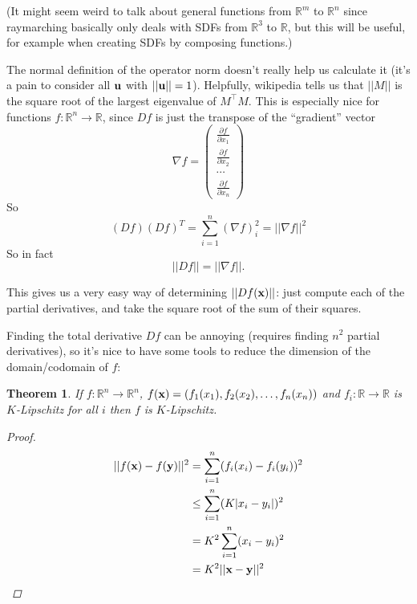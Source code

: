 \documentclass{article}
\newcommand\bb\mathbb
\renewcommand\vec\textbf
\newtheorem{theorem}{Theorem}
\newcommand\pp[2]{\frac{\partial #1}{\partial #2}}
\newcommand\transpose{^\top}
\begin{document}
(It might seem weird to talk about general functions from $\bb R^m$ to $\bb R^n$ since
raymarching basically only deals with SDFs from $\bb R^3$ to $\bb R$, but this will be useful,
for example when creating SDFs by composing functions.)

The normal definition of the operator norm doesn't really help us calculate it (it's a pain
to consider all $\vec u$ with $||\vec u|| = 1$). Helpfully, wikipedia tells us that
$||M||$ is the square root of the largest eigenvalue of $M\transpose M$.
This is especially nice for functions $f:\bb R^n\to \bb R$, since $Df$ is just the transpose of the ``gradient''
vector
$$\nabla f = \begin{pmatrix}
\pp f{x_1}\\ \pp f{x_2}\\\cdots\\\pp f{x_n}
\end{pmatrix}$$
So
$$(Df)(Df)^T = \sum_{i=1}^n (\nabla f)_i^2 = ||\nabla f||^2$$
So in fact
$$||Df|| = ||\nabla f||.$$

This gives us a very easy way of determining $||Df(\vec x)||$: just compute each of the
partial derivatives, and take the square root of the sum of their squares.

Finding the total derivative $Df$ can be annoying (requires finding $n^2$ partial derivatives),
so it's nice to have some tools to reduce the dimension of the domain/codomain of $f$:
\begin{theorem}
\label{component-wise}
If $f:\bb R^n\to\bb R^n$, $f(\vec x) = (f_1(x_1) , f_2(x_2), \dots, f_n(x_n))$
and $f_i:\bb R\to\bb R$ is $K$-Lipschitz for all $i$ then $f$ is $K$-Lipschitz.
\begin{proof}
\begin{align*}
||f(\vec x) - f(\vec y)||^2 &= \sum_{i=1}^n (f_i(x_i) - f_i(y_i))^2\\
&\leq \sum_{i=1}^n (K|x_i - y_i|)^2\\
&= K^2\sum_{i=1}^n (x_i - y_i)^2\\
&= K^2||\vec x - \vec y||^2
\end{align*}
\end{proof}
\end{theorem}
\end{document}
